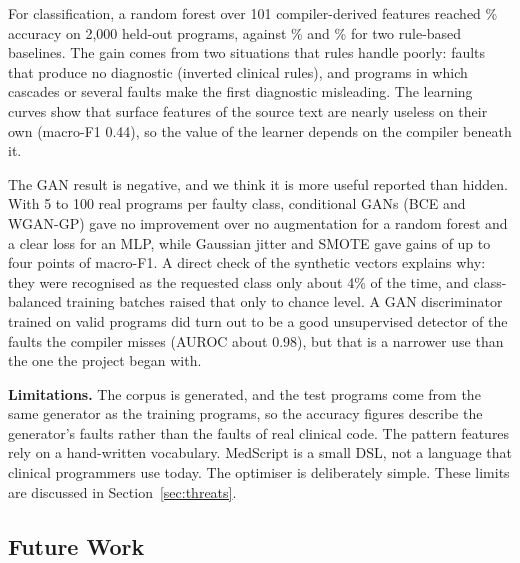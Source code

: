 \documentclass[conference]{IEEEtran}
\begin{document}
For classification, a random forest over 101 compiler-derived features reached \RFAcc\% accuracy on 2{,}000 held-out programs, against
\RuleFirstAcc\% and \RulePrioAcc\% for two rule-based baselines. The gain comes from two situations that rules handle poorly: faults that
produce no diagnostic (inverted clinical rules), and programs in which cascades or several faults make the first diagnostic
misleading. The learning curves show that surface features of the source text are nearly useless on their own (macro-F1 0.44), so
the value of the learner depends on the compiler beneath it.

The GAN result is negative, and we think it is more useful reported than hidden. With 5 to 100 real programs per faulty class, conditional
GANs (BCE and WGAN-GP) gave no improvement over no augmentation for a random forest and a clear loss for an MLP, while Gaussian
jitter and SMOTE gave gains of up to four points of macro-F1. A direct check of the synthetic vectors explains why: they were recognised as the requested class
only about 4\% of the time, and class-balanced training batches raised that only to chance level. A GAN discriminator trained on valid programs did
turn out to be a good unsupervised detector of the faults the compiler misses (AUROC about 0.98), but that is a narrower use than the one the project began with.

\textbf{Limitations.} The corpus is generated, and the test programs come from the same generator as the training programs, so the accuracy figures describe the
generator's faults rather than the faults of real clinical code. The pattern features rely on a hand-written vocabulary. MedScript is a small DSL, not a language
that clinical programmers use today. The optimiser is deliberately simple. These limits are discussed in Section~\ref{sec:threats}.

\subsection{Future Work}
\end{document}

